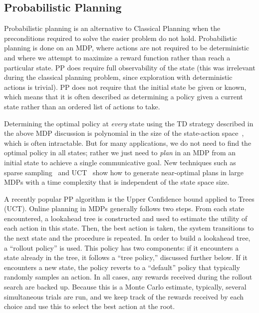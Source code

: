 \subsection{Probabilistic Planning}

Probabilistic planning is an alternative to Classical Planning when the preconditions required to solve the
easier problem do not hold.  Probabilistic planning is done on an MDP, where actions are not required
to be deterministic and where we attempt to maximize a reward function rather than reach a particular
state.  PP does require full observability of the state (this was irrelevant during the classical planning
problem, since exploration with deterministic actions is trivial).  PP does not require that the initial
state be given or known, which means that it is often described as determining a policy given a current
state rather than an ordered list of actions to take.

Determining the optimal policy at {\em every} state using the TD
strategy described in the above MDP discussion is polynomial in the size of the state-action
space~\cite{brafman_2003_rmax}, which is often intractable.
But for many applications, we do not
need to find the optimal policy in all states; rather we just need to {\em plan} in
an MDP from an initial state to achieve a single communicative goal. New techniques such
as sparse sampling~\cite{kearns_1999_sparse} and
UCT~\cite{kocsis_bandit_2006} show how to generate near-optimal plans
in large MDPs with a time complexity that is independent of the state
space size.

A recently popular PP algorithm is the Upper Confidence bound applied to Trees (UCT)\cite{kocsis_bandit_2006}.
Online planning in MDPs generally follows two steps. From each state
encountered, a lookahead tree is constructed and used to estimate the
utility of each action in this state. Then, the best action is taken,
the system transitions to the next state and the procedure is
repeated. In order to build a lookahead tree, a ``rollout policy'' is
used. This policy has two components: if it encounters a state already
in the tree, it follows a ``tree policy,'' discussed further below. If
it encounters a new state, the policy reverts to a ``default'' policy
that typically randomly samples an action. In all cases, any rewards
received during the rollout search are backed up. Because this is a
Monte Carlo estimate, typically, several simultaneous trials are run,
and we keep track of the rewards received by each choice and
use this to select the best action at the root.

